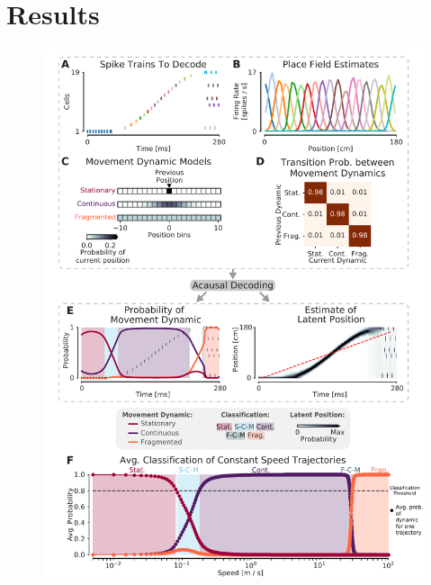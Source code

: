 \documentclass[9pt,lineno]{elife}
\begin{document}
\section*{Results}

\begin{figure}
\includegraphics[width=0.75\linewidth]{figures/Figure1/Figure1_v7}

\end{figure}
\end{document}

